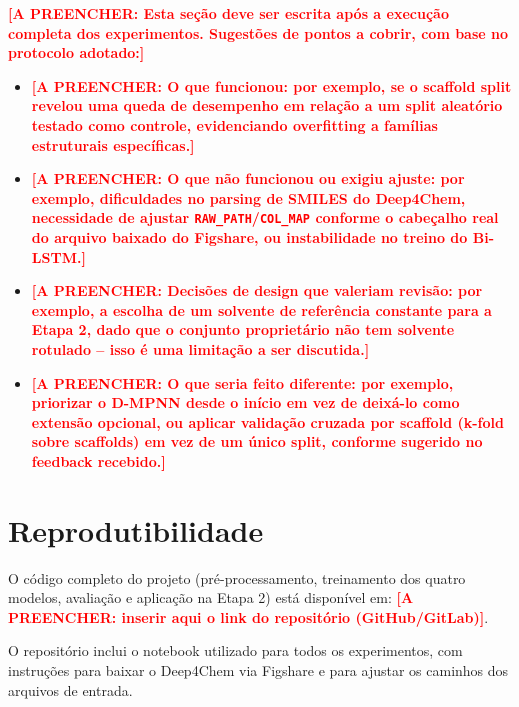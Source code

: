 \documentclass[12pt]{article}
\newcommand{\preencher}[1]{\textcolor{red}{\bfseries [A PREENCHER: #1]}}
\begin{document}
\preencher{Esta seção deve ser escrita após a execução completa dos experimentos.
Sugestões de pontos a cobrir, com base no protocolo adotado:}

\begin{itemize}
  \item \preencher{O que funcionou: por exemplo, se o scaffold split revelou uma queda de
  desempenho em relação a um split aleatório testado como controle, evidenciando
  overfitting a famílias estruturais específicas.}
  \item \preencher{O que não funcionou ou exigiu ajuste: por exemplo, dificuldades no
  parsing de SMILES do Deep4Chem, necessidade de ajustar \texttt{RAW\_PATH}/\texttt{COL\_MAP}
  conforme o cabeçalho real do arquivo baixado do Figshare, ou instabilidade no treino do
  Bi-LSTM.}
  \item \preencher{Decisões de design que valeriam revisão: por exemplo, a escolha de um
  solvente de referência constante para a Etapa 2, dado que o conjunto proprietário não
  tem solvente rotulado -- isso é uma limitação a ser discutida.}
  \item \preencher{O que seria feito diferente: por exemplo, priorizar o D-MPNN desde o
  início em vez de deixá-lo como extensão opcional, ou aplicar validação cruzada por
  scaffold (k-fold sobre scaffolds) em vez de um único split, conforme sugerido no
  feedback recebido.}
\end{itemize}


\section{Reprodutibilidade}
\label{sec:reprodutibilidade}

O código completo do projeto (pré-processamento, treinamento dos quatro modelos,
avaliação e aplicação na Etapa 2) está disponível em:
\preencher{inserir aqui o link do repositório (GitHub/GitLab)}.

O repositório inclui o notebook utilizado para todos os experimentos, com instruções para
baixar o Deep4Chem via Figshare e para ajustar os caminhos dos arquivos de entrada.




\end{document}
